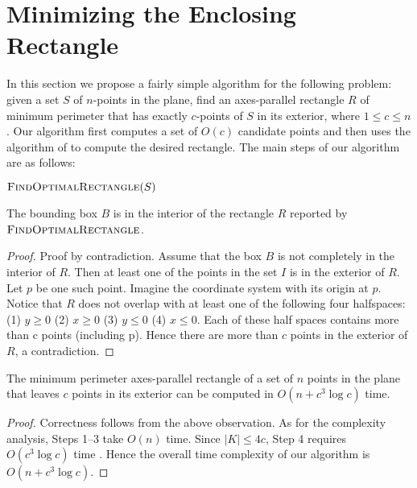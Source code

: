 \documentclass[lotsofwhite]{patmorin}
\begin{document}
\section{Minimizing the Enclosing Rectangle}
In this section we propose a fairly simple algorithm for the following
problem:  given a set $S$ of $n$-points in the plane, find an
axes-parallel rectangle $R$ of minimum perimeter that has exactly
$c$-points of $S$ in its exterior, where $1\le c \le n$.  Our
algorithm first computes a set of $O(c)$ candidate points and then
uses the algorithm of \cite{aiks89} to compute the desired rectangle.
The main steps of our algorithm are as follows:

\begin{minipage}{5.5in}
\noindent$\textsc{FindOptimalRectangle}(S)$
\begin{algorithmic}[1]
\end{algorithmic}
\end{minipage}

\begin{obs}\label{bounding-box-obs}
 The bounding box $B$ is in the interior of the rectangle $R$ reported
 by $\textsc{FindOptimalRectangle}$.
\end{obs}
\begin{proof}
Proof by contradiction. 
Assume that the box $B$ is not completely in
the interior of $R$. Then at least one of the points in the set $I$ is in the
exterior of $R$. Let $p$ be one such point. Imagine the coordinate
system with its origin at $p$.
Notice that  $R$ does not overlap with at least one of the following four
halfspaces: (1) $y\ge 0$ (2) $x\ge 0$ (3) $y\le 0$  (4) $x\le 0$.  
Each of these half spaces contains more than c points (including p).
Hence there are more than $c$ points in the exterior of $R$, a contradiction.
\end{proof}

\begin{thm}
The minimum perimeter axes-parallel rectangle of a set of $n$ points
in the plane that leaves $c$ points in its exterior can be computed in
$O(n+c^3\log c)$ time.
\end{thm}
\begin{proof}
Correctness follows from the above observation. As for the complexity
analysis, Steps 1--3 take $O(n)$ time. Since $|K|\le 4c$, Step 4
requires $O(c^3\log c)$ time \cite{aiks89}. Hence the overall
time complexity of our algorithm is $O(n+c^3\log c)$.
\end{proof}
\end{document}
